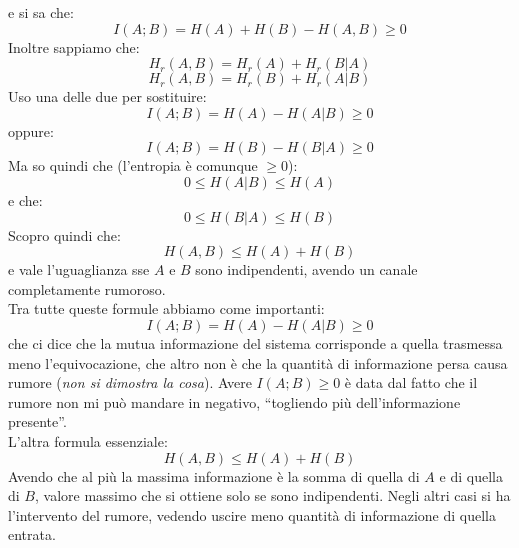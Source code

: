 \documentclass[a4paper,12pt, oneside]{book}
\begin{document}
e si sa che:
\[I(A;B)=H(A)+H(B)-H(A,B)\geq 0\]
Inoltre sappiamo che:
\[H_r(A,B)=H_r(A)+H_r(B|A)\]
\[H_r(A,B)=H_r(B)+H_r(A|B)\]
Uso una delle due per sostituire:
\[I(A;B)=H(A)-H(A|B)\geq 0\]
oppure:
\[I(A;B)=H(B)-H(B|A)\geq 0\]
Ma so quindi che (l'entropia è comunque $\geq 0$):
\[0\leq H(A|B)\leq H(A)\]
e che:
\[0\leq H(B|A)\leq H(B)\]
Scopro quindi che:
\[H(A,B)\leq H(A)+H(B)\]
e vale l'uguaglianza sse $A$ e $B$ sono indipendenti, avendo un canale
completamente rumoroso.\\
Tra tutte queste formule abbiamo come importanti:
\[I(A;B)=H(A)-H(A|B)\geq 0\]
che ci dice che la mutua informazione del sistema corrisponde a quella trasmessa
meno l'equivocazione, che altro non è che la quantità di informazione persa
causa rumore (\textit{non si dimostra la cosa}). Avere $I(A;B)\geq 0$ è data dal
fatto che il rumore non mi può mandare in negativo, ``togliendo più
dell'informazione presente''.\\
L'altra formula essenziale:
\[H(A,B)\leq H(A)+H(B)\]
Avendo che al più la massima informazione è la somma di quella di $A$ e di
quella di $B$, valore massimo che si ottiene solo se sono indipendenti. Negli
altri casi si ha l'intervento del rumore, vedendo uscire meno quantità di
informazione di quella entrata.
\end{document}
